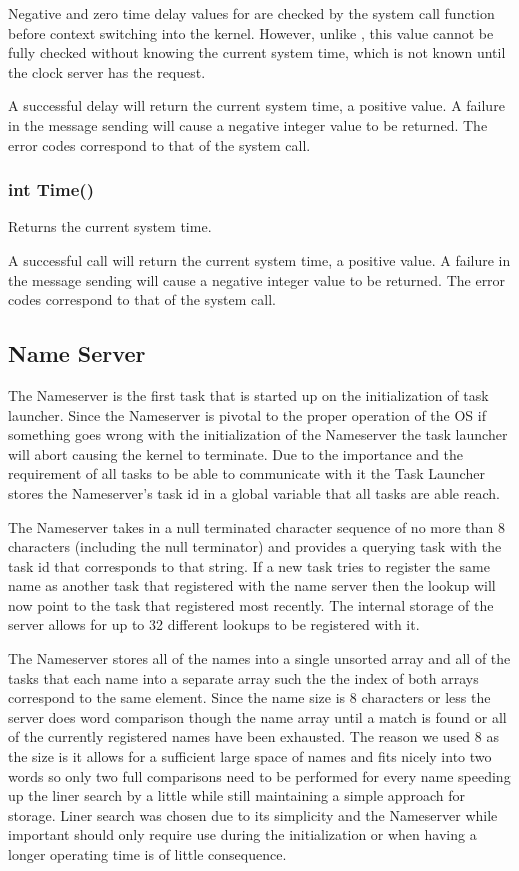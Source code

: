 \documentclass[pdftex,10pt,a4paper]{article}
\begin{document}
Negative and zero time delay values for  are checked by the
system call function before context switching into the
kernel. However, unlike , this value cannot be fully
checked without knowing the current system time, which is not known
until the clock server has the request.

A successful delay will return the current system time, a positive
value. A failure in the message sending will cause a negative integer
value to be returned. The error codes correspond to that of the
 system call.


\subsubsection*{int Time()}

Returns the current system time.

A successful call will return the current system time, a positive
value. A failure in the message sending will cause a negative integer
value to be returned. The error codes correspond to that of the
 system call.


\subsection*{Name Server}

The Nameserver is the first task that is started up on the
initialization of task launcher. Since the Nameserver is pivotal to
the proper operation of the OS if something goes wrong with the
initialization of the Nameserver the task launcher will abort causing
the kernel to terminate. Due to the importance and the requirement of
all tasks to be able to communicate with it the Task Launcher stores
the Nameserver’s task id in a global variable that all tasks are able
reach.

The Nameserver takes in a null terminated character sequence of no
more than 8 characters (including the null terminator) and provides a
querying task with the task id that corresponds to that string. If a
new task tries to register the same name as another task that
registered with the name server then the lookup will now point to the
task that registered most recently. The internal storage of the server
allows for up to 32 different lookups to be registered with it.

The Nameserver stores all of the names into a single unsorted array
and all of the tasks that each name into a separate array such the the
index of both arrays correspond to the same element. Since the name
size is 8 characters or less the server does word comparison though
the name array until a match is found or all of the currently
registered names have been exhausted. The reason we used 8 as the size
is it allows for a sufficient large space of names and fits nicely
into two words so only two full comparisons need to be performed for
every name speeding up the liner search by a little while still
maintaining a simple approach for storage. Liner search was chosen due
to its simplicity and the Nameserver while important should only
require use during the initialization or when having a longer
operating time is of little consequence.
\end{document}
